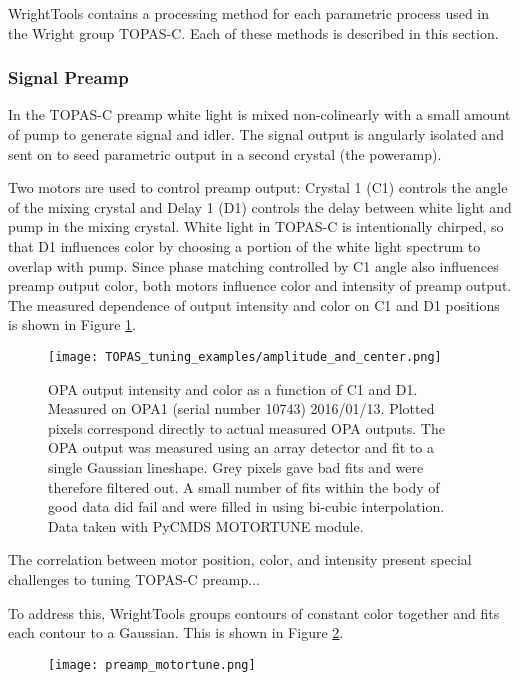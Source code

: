 WrightTools contains a processing method for each parametric process used in the Wright group TOPAS-C. Each of these methods is described in this section.

\subsubsection{Signal Preamp}

In the TOPAS-C preamp white light is mixed non-colinearly with a small amount of pump to generate signal and idler. The signal output is angularly isolated and sent on to seed parametric output in a second crystal (the poweramp). 

Two motors are used to control preamp output: Crystal 1 (C1) controls the angle of the mixing crystal and Delay 1 (D1) controls the delay between white light and pump in the mixing crystal. White light in TOPAS-C is intentionally chirped, so that D1 influences color by choosing a portion of the white light spectrum to overlap with pump. Since phase matching controlled by C1 angle also influences preamp output color, both motors influence color and intensity of preamp output. The measured dependence of output intensity and color on C1 and D1 positions is shown in Figure \ref{fig:TOPAS amplitude and center}.

\begin{figure}
	\begin{centering}
		\texttt{[image: TOPAS\_tuning\_examples/amplitude\_and\_center.png]}
		\caption{OPA output intensity and color as a function of C1 and D1. Measured on OPA1 (serial number 10743) 2016/01/13. Plotted pixels correspond directly to actual measured OPA outputs. The OPA output was measured using an array detector and fit to a single Gaussian lineshape. Grey pixels gave bad fits and were therefore filtered out. A small number of fits within the body of good data did fail and were filled in using bi-cubic interpolation. Data taken with PyCMDS MOTORTUNE module.}
	\end{centering}
	\label{fig:TOPAS amplitude and center}
\end{figure}

The correlation between motor position, color, and intensity present special challenges to tuning TOPAS-C preamp...

To address this, WrightTools groups contours of constant color together and fits each contour to a Gaussian. This is shown in Figure \ref{fig:TOPAS contour fit}.

\begin{figure}
	\begin{centering}
		\texttt{[image: preamp\_motortune.png]}
		\caption{}
	\end{centering}
	\label{fig:TOPAS contour fit}
\end{figure}


